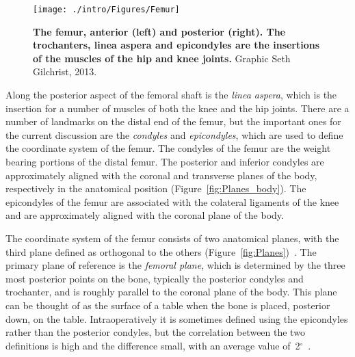 \begin{figure}
\centering
\texttt{[image: ./intro/Figures/Femur]}
\caption[The femur]{\textbf{The femur, anterior (left) and posterior (right). The trochanters, linea aspera and epicondyles are the insertions of the muscles of the hip and knee joints.} Graphic \textcopyright Seth Gilchrist, 2013.}
\label{fig:Femur}
\end{figure}

Along the posterior aspect of the femoral shaft is the \textit{linea aspera}, which is the insertion for a number of muscles of both the knee and the hip joints.
There are a number of landmarks on the distal end of the femur, but the important ones for the current discussion are the \textit{condyles} and \textit{epicondyles}, which are used to define the coordinate system of the femur.
The condyles of the femur are the weight bearing portions of the distal femur.
The posterior and inferior condyles are approximately aligned with the coronal and transverse planes of the body, respectively in the anatomical position (Figure~\ref{fig:Planes_body}).
The epicondyles of the femur are associated with the colateral ligaments of the knee and are approximately aligned with the coronal plane of the body.

The coordinate system of the femur consists of two anatomical planes, with the third plane defined as orthogonal to the others (Figure~\ref{fig:Planes})~\citep{gray_anatomy_1918}.
The primary plane of reference is the \textit{femoral plane}, which is determined by the three most posterior points on the bone, typically the posterior condyles and trochanter, and is roughly parallel to the coronal plane of the body.
This plane can be thought of as the surface of a table when the bone is placed, posterior down, on the table.
Intraoperatively it is sometimes defined using the epicondyles rather than the posterior condyles, but the correlation between the two definitions is high and the difference small, with an average value of~2$^\circ$~\citep{dorr_comparison_2009}.

